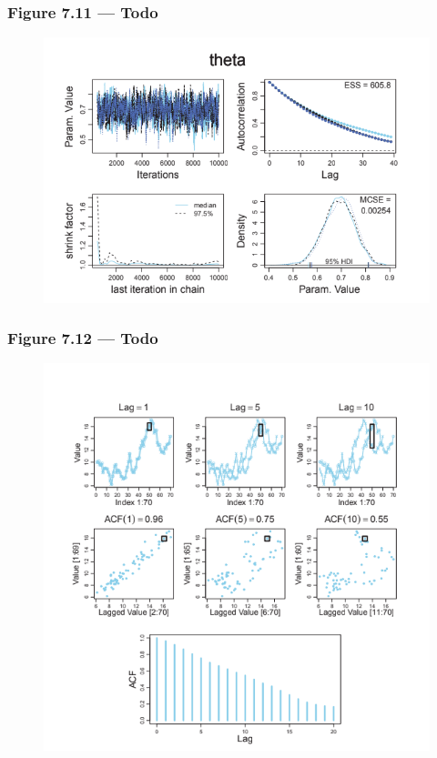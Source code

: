 \documentclass[usenames,dvipsnames,table]{beamer}
\begin{document}
\begin{frame}
\frametitle{Figure 7.11 --- Todo}
\begin{figure}
\centering
\includegraphics[height=0.8\textheight]{img/fig7_11}
\end{figure}
\end{frame}

\begin{frame}
\frametitle{Figure 7.12 --- Todo}
\begin{figure}
\centering
\includegraphics[height=0.8\textheight]{img/fig7_12}
\end{figure}
\end{frame}
\end{document}
